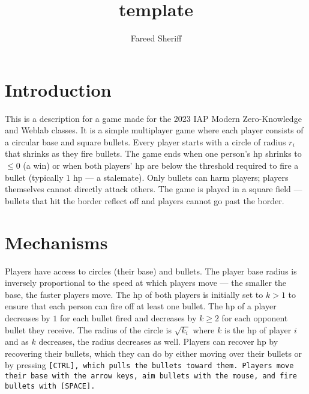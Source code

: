 \documentclass[10pt]{article}
\begin{document}
\title{template}
\newcommand{\hp}{\textsf{hp}\xspace}
\author{Fareed Sheriff}
\maketitle
\section{Introduction}
\par This is a description for a game made for the 2023 IAP Modern Zero-Knowledge and Weblab classes. It is a simple multiplayer game where each player consists of a circular base and square bullets. Every player starts with a circle of radius $r_i$ that shrinks as they fire bullets. The game ends when one person's \hp shrinks to $\leq 0$ (a win) or when both players' \hp are below the threshold required to fire a bullet (typically $1$ {\hp} --- a stalemate). Only bullets can harm players; players themselves cannot directly attack others. The game is played in a square field --- bullets that hit the border reflect off and players cannot go past the border.
\section{Mechanisms}
\par Players have access to circles (their base) and bullets. The player base radius is inversely proportional to the speed at which players move --- the smaller the base, the faster players move. The \hp of both players is initially set to $k>1$ to ensure that each person can fire off at least one bullet. The \hp of a player decreases by $1$ for each bullet fired and decreases by $k\geq 2$ for each opponent bullet they receive. The radius of the circle is $\sqrt{k_i}$ where $k$ is the \hp of player $i$ and as $k$ decreases, the radius decreases as well. Players can recover \hp by recovering their bullets, which they can do by either moving over their bullets or by pressing \tt{[CTRL]}, which pulls the bullets toward them. Players move their base with the arrow keys, aim bullets with the mouse, and fire bullets with \tt{[SPACE]}.
\end{document}
